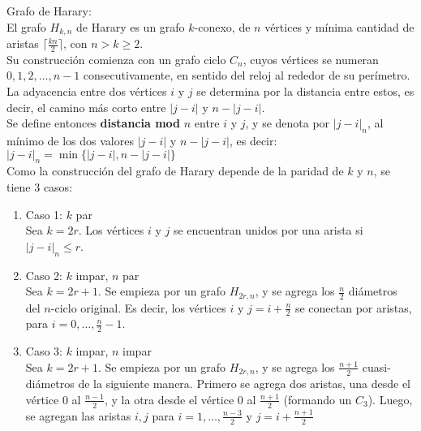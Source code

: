 \documentclass[a4paper,11pt]{report}
\begin{document}
 \newpage
Grafo de Harary: \\
El grafo $H_{k,n}$ de Harary es un grafo $k$-conexo, de $n$ vértices y mínima cantidad de aristas $\lceil \frac{kn}{2}\rceil$, con $n > k \geqslant 2$. \\
Su construcción comienza con un grafo ciclo $C_n$, cuyos vértices se numeran $0,1,2,\dots,n-1$ consecutivamente, en sentido del reloj al rededor de su perímetro. \\
La adyacencia entre dos vértices $i$ y $j$ se determina por la distancia entre estos, es decir, el camino más corto entre $|j-i|$ y $n-|j-i|$.\\
Se define entonces {\bf distancia mod} $n$ entre $i$ y $j$, y se denota por $|j-i|_n$, al mínimo de los dos valores $|j-i|$ y $n-|j-i|$, es decir: \\
 $|j-i|_n = \min{\{|j-i|,n-|j-i|\}}$ \\
Como la construcción del grafo de Harary depende de la paridad de $k$ y $n$, se tiene 3 casos: \\
\begin{enumerate}
\item Caso 1: $k$ par \\
Sea $k=2r$. Los vértices $i$ y $j$ se encuentran unidos por una arista si $|j-i|_n \leqslant r$.\\
\item Caso 2: $k$ impar, $n$ par \\
Sea $k=2r+1$. Se empieza por un grafo $H_{2r,n}$, y se agrega los $\frac{n}{2}$ diámetros del $n$-ciclo original. Es decir, los vértices $i$ y $j=i+\frac{n}{2}$ se conectan por aristas, para $i=0,\dots,\frac{n}{2}-1$.
\item Caso 3: $k$ impar, $n$ impar \\
Sea $k=2r+1$. Se empieza por un grafo $H_{2r,n}$, y se agrega los $\frac{n+1}{2}$ cuasi-diámetros de la siguiente manera. Primero se agrega dos aristas, una desde el vértice 0 al $\frac{n-1}{2}$, y la otra desde el vértice 0 al $\frac{n+1}{2}$  (formando un $C_3$). Luego, se agregan las aristas ${i,j}$ para $i=1,\dots,\frac{n-3}{2}$ y $j=i+\frac{n+1}{2}$
\end{enumerate}
\end{document}
